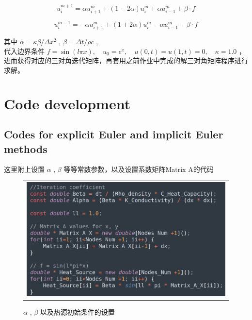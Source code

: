 \documentclass[3p]{elsarticle}
\numberwithin{equation}{section}
\begin{document}
	\begin{equation}
		u_{i}^{m+1}=\alpha u_{i+1}^{m}+(1-2 \alpha) u_{i}^{m}+\alpha u_{i-1}^{m} + \beta \cdot f
	\end{equation}

	\begin{equation}
	    u_{i}^{m-1} = -\alpha u_{i+1}^{m}+(1+2 \alpha) u_{i}^{m}-\alpha u_{i-1}^{m} - \beta \cdot f
	\end{equation}

    其中 $ \alpha =  \kappa \beta / \Delta x^{2} $ , $ \beta = \Delta t / \rho c  $ , \\ 代入边界条件 $f = \sin (l \pi x), \quad u_{0} = e^{x}, \quad u(0, t) = u(1, t) = 0, \quad \kappa = 1.0$ ，进而获得对应的三对角迭代矩阵，再套用之前作业中完成的解三对角矩阵程序进行求解。
    
    \section{Code development}
    
    \subsection{Codes for explicit Euler and implicit Euler methods}
    
    这里附上设置 $ \alpha $ , $ \beta  $ 等等常数参数，以及设置系数矩阵Matrix A的代码
    
    \begin{figure}[h]
    	\begin{center}
    		\begin{tabular}{c}
    			\includegraphics[angle=0, scale=0.25]{./figures/matrix_coefficient.png}
    		\end{tabular}
    	\end{center}
    	\caption{$ \alpha $ , $ \beta  $ 以及热源初始条件的设置}
    	\label{fig:illustration-matrix_coefficient}
    \end{figure}
\end{document}
